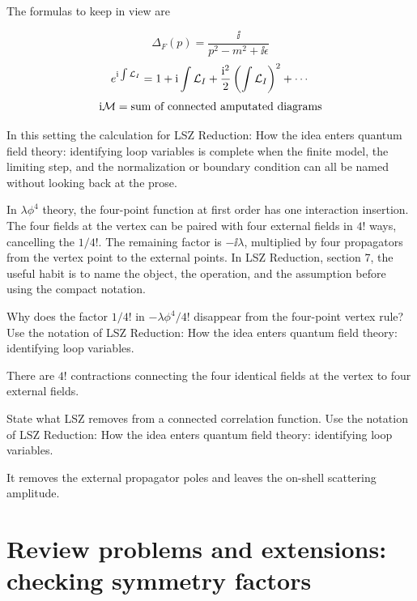 The formulas to keep in view are

\[
  \Delta_F(p)=\frac{\ii}{p^2-m^2+\ii\epsilon}
\]
\[
  e^{\mathrm i\int\mathcal L_I}=1+\mathrm i\int\mathcal L_I+\frac{\mathrm i^2}{2}\left(\int\mathcal L_I\right)^2+\cdots
\]
\[
  \mathrm i\mathcal M=\hbox{sum of connected amputated diagrams}
\]

In this setting the calculation for LSZ Reduction: How the idea enters quantum field theory: identifying loop variables is complete when the finite model, the limiting step, and the normalization or boundary condition can all be named without looking back at the prose.




\begin{example}
In \(\lambda\phi^4\) theory, the four-point function at first order has one interaction insertion.  The four fields at the vertex can be paired with four external fields in \(4!\) ways, cancelling the \(1/4!\).  The remaining factor is \(-\ii\lambda\), multiplied by four propagators from the vertex point to the external points.  In LSZ Reduction, section 7, the useful habit is to name the object, the operation, and the assumption before using the compact notation.
\end{example}



\begin{exercise}
Why does the factor \(1/4!\) in \(-\lambda\phi^4/4!\) disappear from the four-point vertex rule?  Use the notation of LSZ Reduction: How the idea enters quantum field theory: identifying loop variables.
\begin{answer}
There are \(4!\) contractions connecting the four identical fields at the vertex to four external fields.
\end{answer}
\end{exercise}

\begin{exercise}
State what LSZ removes from a connected correlation function.  Use the notation of LSZ Reduction: How the idea enters quantum field theory: identifying loop variables.
\begin{answer}
It removes the external propagator poles and leaves the on-shell scattering amplitude.
\end{answer}
\end{exercise}



\section{Review problems and extensions: checking symmetry factors}


